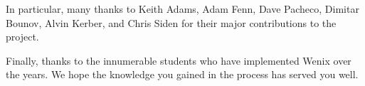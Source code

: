 In particular, many thanks to Keith Adams, Adam Fenn, Dave Pacheco, Dimitar Bounov, Alvin Kerber, and Chris Siden for their major contributions to the project.

Finally, thanks to the innumerable students who have implemented Wenix over the years. We hope the knowledge you gained in the process has served you well.

